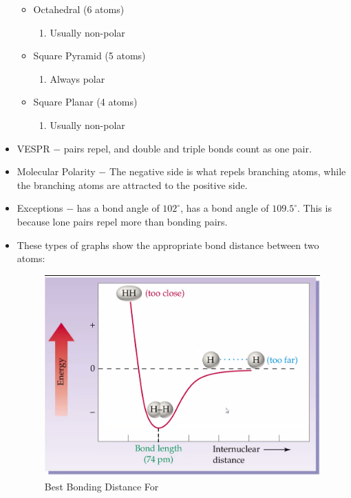 \documentclass[12pt]{article}
\begin{document}
\begin{itemize}
    \begin{itemize}

      \item Octahedral (6 atoms)

        \begin{enumerate}

          \item Usually non-polar

        \end{enumerate}

      \item Square Pyramid (5 atoms)

        \begin{enumerate}

          \item Always polar

        \end{enumerate}

      \item Square Planar (4 atoms)

        \begin{enumerate}

          \item Usually non-polar

        \end{enumerate}

    \end{itemize}

  \item VESPR $-$  pairs repel, and double and triple bonds count as one pair.

  \item Molecular Polarity $-$ The negative side is what repels branching atoms, while the branching atoms are attracted to the positive side.

  \item Exceptions $-$  has a bond angle of $102^{\circ}$,  has a bond angle of $109.5^{\circ}$. This is because lone pairs repel more than bonding pairs.

  \item These types of graphs show the appropriate bond distance between two atoms:

    \begin{figure}[h]
      \centering
      \includegraphics[width=.7\textwidth]{Figures/HappyGraph.png}
      \caption{Best Bonding Distance For }
      \label{fig:1}
    \end{figure}


\end{itemize}
\end{document}
